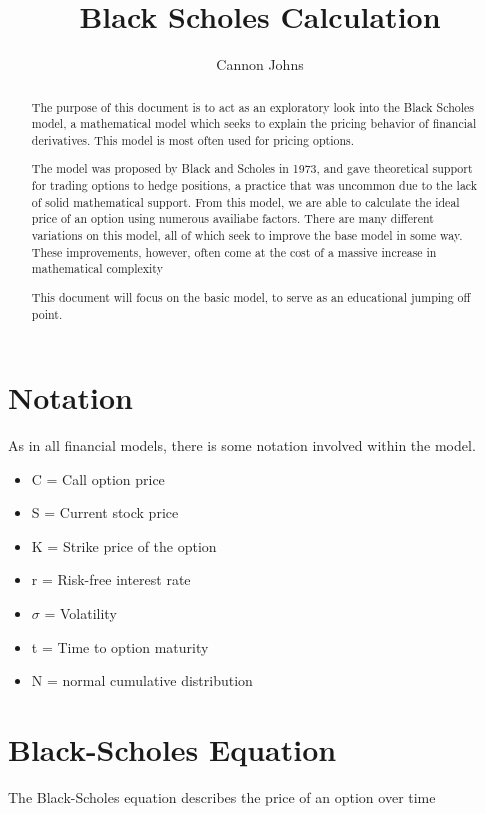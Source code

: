 \documentclass[a4paper,10pt]{article}
\title{Black Scholes Calculation}
\author{Cannon Johns}
\begin{document}
\maketitle

\begin{abstract}

The purpose of this document is to act as an exploratory look into the Black Scholes model, a mathematical model which seeks to explain the pricing behavior of financial derivatives. This model is most often used for pricing options.

The model was proposed by Black and Scholes in 1973, and gave theoretical support for trading options to hedge positions, a practice that was uncommon due to the lack of solid mathematical support. From this model, we are able to calculate the ideal price of an option using numerous availiabe factors. There are many different variations on this model, all of which seek to improve the base model in some way. These improvements, however, often come at the cost of a massive increase in mathematical complexity

This document will focus on the basic model, to serve as an educational jumping off point.

\end{abstract}

\section{Notation}
As in all financial models, there is some notation involved within the model.

\begin{itemize}
 \item[] C = Call option price 
 \item[] S = Current stock price
 \item[] K = Strike price of the option
 \item[] r = Risk-free interest rate
 \item[] $\sigma$ = Volatility
 \item[] t = Time to option maturity
 \item[] N = normal cumulative distribution
\end{itemize}

\newpage 

\section{Black-Scholes Equation}
The Black-Scholes equation describes the price of an option over time
\end{document}

